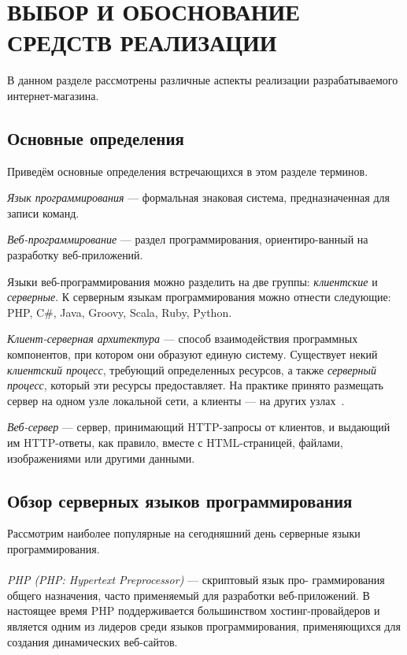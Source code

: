 \section[Выбор и обоснование средств реализации]{ВЫБОР И ОБОСНОВАНИЕ \\ СРЕДСТВ РЕАЛИЗАЦИИ}
\label{sec:choice}

В данном разделе рассмотрены различные аспекты реализации разрабатываемого интернет-магазина.

\subsection{Основные определения}
\label{sub:choice_theory}

Приведём основные определения встречающихся в этом разделе терминов.

\textit{Язык программирования} --- формальная знаковая система, предназначенная для записи команд.

\textit{Веб-программирование} --- раздел программирования, ориентиро-ванный на разработку веб-приложений.

Языки веб-программирования можно разделить на две группы: \textit{клиентские}
и \textit{серверные}. К серверным языкам программирования можно
отнести следующие: PHP, C\#, Java, Groovy, Scala, Ruby, Python.

\textit{Клиент-серверная архитектура} --- способ взаимодействия программных компонентов,
при котором они образуют единую систему. Существует некий \textit{клиентский процесс},
требующий определенных ресурсов, а также \textit{серверный процесс}, который
эти ресурсы предоставляет. На практике принято размещать сервер на одном узле локальной сети,
а клиенты --- на других узлах~\cite{konnolli03}.

\textit{Веб-сервер} --- сервер, принимающий HTTP-запросы от клиентов, и выдающий им
HTTP-ответы, как правило, вместе с HTML-страницей, файлами, изображениями или другими данными.

\subsection{Обзор серверных языков программирования}
\label{sub:choice_server_language}

Рассмотрим наиболее популярные на сегодняшний день серверные языки программирования.

\paragraph{}
\textit{PHP (PHP: Hypertext Preprocessor)} --- скриптовый язык про-
граммирования общего назначения, часто применяемый для разработки веб-приложений.
В настоящее время PHP поддерживается большинством хостинг-провайдеров
и является одним из лидеров среди языков программирования, применяющихся для создания
динамических веб-сайтов.

